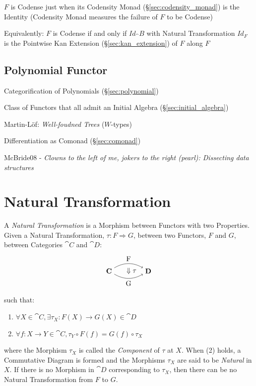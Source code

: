$F$ is Codense just when its Codensity Monad
(\S\ref{sec:codensity_monad}) is the Identity (Codensity Monad
measures the failure of $F$ to be Codense)

Equivalently: $F$ is Codense if and only if $Id_\cat{B}$ with Natural
Transformation $Id_F$ is the Pointwise Kan Extension
(\S\ref{sec:kan_extension}) of $F$ along $F$



\subsection{Polynomial Functor} \label{sec:polynomial_functor}

Categorification of Polynomials (\S\ref{sec:polynomial})

Class of Functors that all admit an Initial Algebra
(\S\ref{sec:initial_algebra})

Martin-L\"of: \emph{Well-foudned Trees} ($W$-types) %

Differentiation as Comonad (\S\ref{sec:comonad})

McBride08 - \emph{Clowns to the left of me, jokers to the right (pearl):
  Dissecting data structures}



\section{Natural Transformation}\label{sec:natural_transformation}

A \emph{Natural Transformation} is a Morphism between Functors with
two Properties. Given a Natural Transformation, $\tau : F \Rightarrow
G$, between two Functors, $F$ and $G$, between Categories $\cat{C}$
and $\cat{D}$:
\[
  \begin{tikzpicture}
    \node (C) at (-1,0) {$\cat{C}$};
    \node (D) at (1,0) {$\cat{D}$};
    \node (T) at (0,0) {$\;\;\;\Downarrow\tau$};
    \draw[->,bend left] (C) to node [above] {F} (D);
    \draw[->,bend right] (C) to node [below] {G} (D);
  \end{tikzpicture}
\]
such that:
\begin{enumerate}
  \item $\forall X \in \cat{C},
    \exists \tau_X : F(X) \rightarrow G(X) \in \cat{D}$
  \item $\forall f : X \rightarrow Y \in \cat{C},
    \tau_Y \circ F(f) = G(f) \circ \tau_X$
\end{enumerate}
where the Morphism $\tau_X$ is called the \emph{Component} of $\tau$
at $X$. When (2) holds, a Commutative Diagram is formed and the
Morphisms $\tau_X$ are said to be \emph{Natural} in $X$. If there is
no Morphism in $\cat{D}$ corresponding to $\tau_X$, then there can
be no Natural Transformation from $F$ to $G$.

